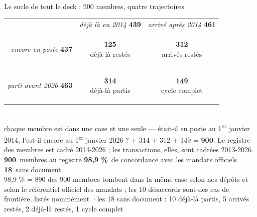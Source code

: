 \documentclass[11pt,aspectratio=169]{beamer}
\newcommand{\kpi}[3]{{\large\textbf{\textcolor{#1}{#2}}}~{\footnotesize #3}}
\newcommand{\defl}[1]{{\scriptsize\color{black!55}#1}}
\begin{document}
\begin{frame}{Le socle de tout le deck : 900 membres, quatre trajectoires}
  \centering
  \begin{tabular}{@{}r@{\;}cc@{}}
    & {\footnotesize\emph{déjà là en 2014} \; \textbf{439}}
    & {\footnotesize\emph{arrivé après 2014} \; \textbf{461}}\\[1mm]
    {\footnotesize\emph{encore en poste} \; \textbf{437}} &
    \colorbox{helec!16}{\parbox[c][13mm][c]{0.34\textwidth}{\centering
      {\Large\textbf{125}}\\[0.4mm]{\footnotesize déjà-là restés}}} &
    \colorbox{okgreen!16}{\parbox[c][13mm][c]{0.34\textwidth}{\centering
      {\Large\textbf{312}}\\[0.4mm]{\footnotesize arrivés restés}}}\\[1.6mm]
    {\footnotesize\emph{parti avant 2026} \; \textbf{463}} &
    \colorbox{helec!8}{\parbox[c][13mm][c]{0.34\textwidth}{\centering
      {\Large\textbf{314}}\\[0.4mm]{\footnotesize déjà-là partis}}} &
    \colorbox{okgreen!8}{\parbox[c][13mm][c]{0.34\textwidth}{\centering
      {\Large\textbf{149}}\\[0.4mm]{\footnotesize cycle complet}}}\\
  \end{tabular}\\[2mm]
  \defl{chaque membre est dans une case et une seule --- était-il en poste au 1\textsuperscript{er} janvier
  2014, l'est-il encore au 1\textsuperscript{er} janvier 2026 ? \quad 125 + 314 + 312 + 149 = \textbf{900}.
  \; Le registre des membres est cadré 2014-2026 ; les transactions, elles, sont cadrées 2013-2026.}\\[3.5mm]
  \kpi{helec}{900}{membres au registre}\qquad
  \kpi{helec}{98,9 \%}{de concordance avec les mandats officiels}\qquad
  \kpi{alertred}{18}{sans document}\\[2mm]
  \defl{98,9 \% = 890 des 900 membres tombent dans la même case selon nos dépôts et selon le
  référentiel officiel des mandats ; les 10 désaccords sont des cas de frontière, listés nommément
  \quad·\quad les 18 sans document : 10 déjà-là partis, 5 arrivés restés,
  2 déjà-là restés, 1 cycle complet}
\end{frame}
\end{document}
